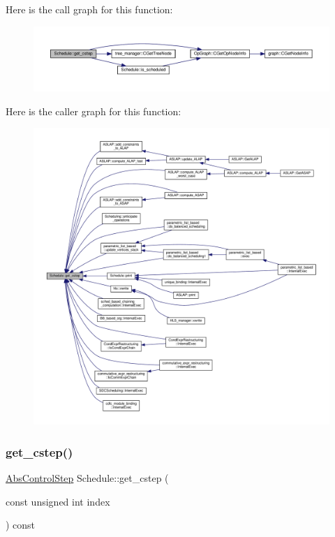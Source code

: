 Here is the call graph for this function\+:
\nopagebreak
\begin{figure}[H]
\begin{center}
\leavevmode
\includegraphics[width=350pt]{df/d61/classSchedule_a7b6c9b65b093277adc5fa53e8b10f551_cgraph}
\end{center}
\end{figure}
Here is the caller graph for this function\+:
\nopagebreak
\begin{figure}[H]
\begin{center}
\leavevmode
\includegraphics[width=350pt]{df/d61/classSchedule_a7b6c9b65b093277adc5fa53e8b10f551_icgraph}
\end{center}
\end{figure}
\mbox{\label{classSchedule_a9899b55e9cb1322b52e3c93bc4d27a70}} 
\subsubsection{\texorpdfstring{get\+\_\+cstep()}{get\_cstep()}\hspace{0.1cm}{\footnotesize\ttfamily [2/2]}}
{\footnotesize\ttfamily \hyperlink{structAbsControlStep}{Abs\+Control\+Step} Schedule\+::get\+\_\+cstep (\begin{DoxyParamCaption}\item[{const unsigned int}]{index }\end{DoxyParamCaption}) const}



